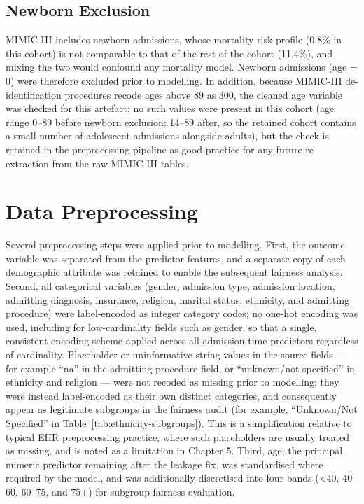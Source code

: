 \documentclass[12pt,a4paper]{report}
\begin{document}
\subsection{Newborn Exclusion}
\label{sec:newborn-fix}
MIMIC-III includes newborn admissions, whose mortality risk profile (0.8\% in this cohort) is not comparable to that of the rest of the cohort (11.4\%), and mixing the two would confound any mortality model. Newborn admissions (age = 0) were therefore excluded prior to modelling. In addition, because MIMIC-III de-identification procedures recode ages above 89 as 300, the cleaned age variable was checked for this artefact; no such values were present in this cohort (age range 0--89 before newborn exclusion; 14--89 after, so the retained cohort contains a small number of adolescent admissions alongside adults), but the check is retained in the preprocessing pipeline as good practice for any future re-extraction from the raw MIMIC-III tables.


\section{Data Preprocessing}
Several preprocessing steps were applied prior to modelling. First, the outcome variable was separated from the predictor features, and a separate copy of each demographic attribute was retained to enable the subsequent fairness analysis. Second, all categorical variables (gender, admission type, admission location, admitting diagnosis, insurance, religion, marital status, ethnicity, and admitting procedure) were label-encoded as integer category codes; no one-hot encoding was used, including for low-cardinality fields such as gender, so that a single, consistent encoding scheme applied across all admission-time predictors regardless of cardinality. Placeholder or uninformative string values in the source fields --- for example ``na'' in the admitting-procedure field, or ``unknown/not specified'' in ethnicity and religion --- were not recoded as missing prior to modelling; they were instead label-encoded as their own distinct categories, and consequently appear as legitimate subgroups in the fairness audit (for example, ``Unknown/Not Specified'' in Table~\ref{tab:ethnicity-subgroups}). This is a simplification relative to typical EHR preprocessing practice, where such placeholders are usually treated as missing, and is noted as a limitation in Chapter 5. Third, age, the principal numeric predictor remaining after the leakage fix, was standardised where required by the model, and was additionally discretised into four bands (\textless 40, 40--60, 60--75, and 75+) for subgroup fairness evaluation.
\end{document}
